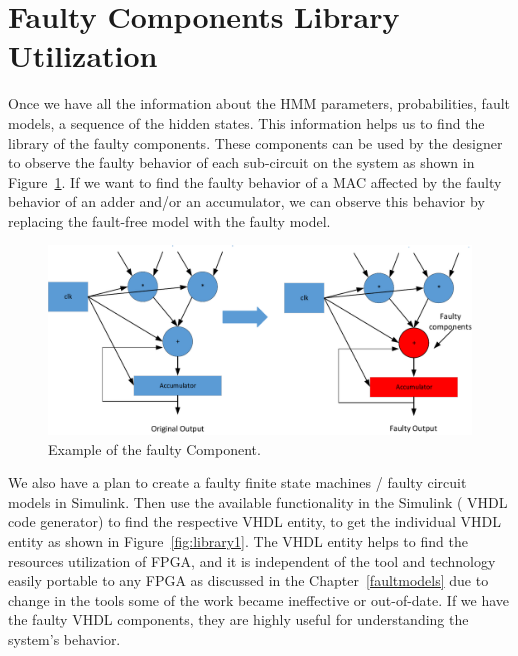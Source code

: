 \section{Faulty Components Library Utilization}
Once we have all the information about the HMM parameters, probabilities, fault models, a sequence of the hidden states. This information helps us to find the library of the faulty components. These components can be used by the designer to observe the faulty behavior of each sub-circuit on the system as shown in Figure~\ref{fig:lib1}.  If we want to find the faulty behavior of a MAC affected by the faulty behavior of an adder and/or an accumulator, we can observe this behavior by replacing the fault-free model with the faulty model.
 
\begin{figure}[tb!]
 \centering
  \captionsetup{justification=centering}    
   \includegraphics[scale=0.6]{Figures/MAC.pdf}
   \caption{Example of the faulty Component.}
\label{fig:lib1}
\end{figure}

We also have a plan to create a faulty finite state machines / faulty circuit models in Simulink. Then use the available functionality in the Simulink ( VHDL code generator) to find the respective VHDL entity, to get the individual VHDL entity as shown in Figure~\ref{fig:library1}. The VHDL entity helps to find the resources utilization of FPGA, and it is independent of the tool and technology easily portable to any FPGA as discussed in the Chapter~\ref{faultmodels} due to change in the tools some of the work became ineffective or out-of-date. If we have the faulty VHDL components, they are highly useful for understanding the system's behavior.


